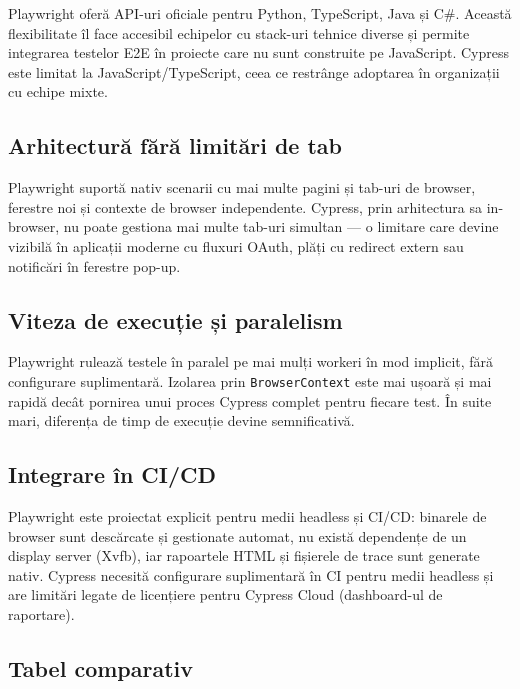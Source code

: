 Playwright oferă API-uri oficiale pentru Python, TypeScript, Java și C\#. Această
flexibilitate îl face accesibil echipelor cu stack-uri tehnice diverse și permite
integrarea testelor E2E în proiecte care nu sunt construite pe JavaScript. Cypress
este limitat la JavaScript/TypeScript, ceea ce restrânge adoptarea în organizații
cu echipe mixte.

\subsection*{Arhitectură fără limitări de tab}

Playwright suportă nativ scenarii cu mai multe pagini și tab-uri de browser, ferestre
noi și contexte de browser independente. Cypress, prin arhitectura sa in-browser,
nu poate gestiona mai multe tab-uri simultan --- o limitare care devine vizibilă
în aplicații moderne cu fluxuri OAuth, plăți cu redirect extern sau notificări
în ferestre pop-up.

\subsection*{Viteza de execuție și paralelism}

Playwright rulează testele în paralel pe mai mulți workeri în mod implicit, fără
configurare suplimentară. Izolarea prin \texttt{BrowserContext} este mai ușoară și
mai rapidă decât pornirea unui proces Cypress complet pentru fiecare test. În suite
mari, diferența de timp de execuție devine semnificativă.

\subsection*{Integrare în CI/CD}

Playwright este proiectat explicit pentru medii headless și CI/CD: binarele de browser
sunt descărcate și gestionate automat, nu există dependențe de un display server
(Xvfb), iar rapoartele HTML și fișierele de trace sunt generate nativ. Cypress
necesită configurare suplimentară în CI pentru medii headless și are limitări legate
de licențiere pentru Cypress Cloud (dashboard-ul de raportare).

\subsection*{Tabel comparativ}


